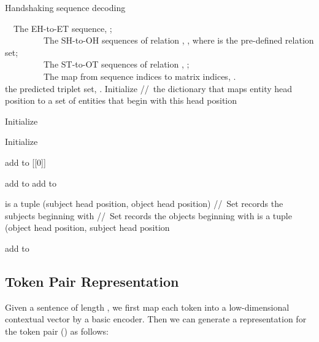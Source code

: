 \documentclass[11pt]{article}
\renewcommand{\algorithmiccomment}[1]{\bgroup\hfill//~#1\egroup}
\begin{document}
\begin{algorithm}[htb]
\footnotesize
{}
\caption{Handshaking sequence decoding}
\label{alg:decoding}
\begin{algorithmic}[1]
\REQUIRE ~~The EH-to-ET sequence, ; \\
~~~~~~~~~The SH-to-OH sequences of relation , , where  is the pre-defined relation set; \\
~~~~~~~~~The ST-to-OT sequences of relation , ; \\
~~~~~~~~~The map from sequence indices to matrix indices, .\\
\ENSURE the predicted triplet set, .
\STATE  Initialize  \algorithmiccomment{the dictionary that maps entity head position to a set of entities that begin with this head position}

\STATE  Initialize  

\STATE  Initialize 


\STATE add  to [[0]] 
\ENDIF
\ENDFOR

\FOR{} 

\STATE add  to  
\STATE  add  to  
\ENDIF
\ENDFOR


\STATE  is a tuple (subject head position, object head position)
\STATE  \algorithmiccomment{Set records the subjects beginning with }
\STATE  \algorithmiccomment{Set records the objects beginning with }
\STATE  is a tuple (object head position, subject head position
\STATE  
\STATE 
\ENDIF

\FOR{}
\FOR{}
\IF{}
\STATE add  to 
\ENDIF
\ENDFOR
\ENDFOR
\ENDFOR
\ENDFOR

\RETURN 
\end{algorithmic}
\end{algorithm}
\subsection{Token Pair Representation}




Given a sentence  of length , we first map each token  into a low-dimensional contextual vector  by a basic encoder. Then we can generate a representation  for the token pair () as follows:
\end{document}
